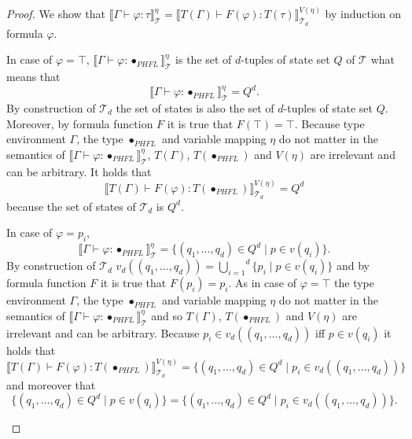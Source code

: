 \begin{proof}
    We show that $\llbracket \Gamma \vdash \varphi \colon \tau \rrbracket^\eta_\mathcal{T} = \llbracket T(\Gamma)
    \vdash F(\varphi) \colon T(\tau) \rrbracket^{V(\eta)}_{\mathcal{T}_d}$ by induction on formula $\varphi$.
    \begin{compactitem}
        \item In case of $\varphi = \top$, $\llbracket \Gamma \vdash \varphi \colon \bullet_{PHFL}
        \rrbracket^\eta_\mathcal{T}$ is the set of $d$-tuples of state set $Q$ of $\mathcal{T}$ what means that
        \[\llbracket \Gamma \vdash \varphi \colon \bullet_{PHFL} \rrbracket^\eta_\mathcal{T} = Q^d.\]
        By construction of $\mathcal{T}_d$ the set of states is also the set of $d$-tuples of state set $Q$.
        Moreover, by formula function $F$ it is true that $F(\top) = \top$. Because type environment $\Gamma$, the
        type $\bullet_{PHFL}$ and variable mapping $\eta$ do not matter in the semantics of $\llbracket \Gamma \vdash
        \varphi \colon \bullet_{PHFL} \rrbracket^\eta_\mathcal{T}$, $T(\Gamma)$, $T(\bullet_{PHFL})$ and $V(\eta)$
        are irrelevant and can be arbitrary. It holds that
        \[\llbracket T(\Gamma) \vdash F(\varphi) \colon T(\bullet_{PHFL}) \rrbracket^{V(\eta)}_{\mathcal{T}_d} = Q^d\]
        because the set of states of $\mathcal{T}_d$ is $Q^d$.

        \item In case of $\varphi = p_i$,
        \[\llbracket \Gamma \vdash \varphi \colon \bullet_{PHFL}
        \rrbracket^\eta_\mathcal{T} = \{(q_1, \dots, q_d)\in Q^d \mid p \in v(q_i)\}.\]
        By construction of $\mathcal{T}_d$ $v_d((q_1, \dots, q_d)) = \overset{d}{\underset{i = 1}{\bigcup}}\{p_i
        \mid p \in v(q_i)\}$ and by formula function $F$ it is true that $F(p_i) = p_i$. As in case of $\varphi =
        \top$ the type environment $\Gamma$, the type $\bullet_{PHFL}$ and variable mapping $\eta$ do not matter in
        the semantics of $\llbracket \Gamma \vdash \varphi \colon \bullet_{PHFL} \rrbracket^\eta_\mathcal{T}$ and so $T
        (\Gamma)$, $T(\bullet_{PHFL})$ and $V(\eta)$ are irrelevant and can be arbitrary. Because $p_i \in v_d((q_1,
        \dots, q_d))$ iff $p \in v(q_i)$ it holds that
        \[\llbracket T (\Gamma) \vdash F(\varphi) \colon T(\bullet_{PHFL}) \rrbracket^{V(\eta)}_{\mathcal{T}_d} = \{
        (q_1, \dots, q_d) \in Q^d \mid p_i \in v_d((q_1, \dots, q_d))\}\]
        and moreover that
        \[\{(q_1, \dots, q_d)\in Q^d \mid p \in v(q_i)\} =\{(q_1, \dots, q_d) \in Q^d \mid p_i \in
        v_d((q_1, \dots, q_d))\}.\]


\end{compactitem}
\end{proof}
